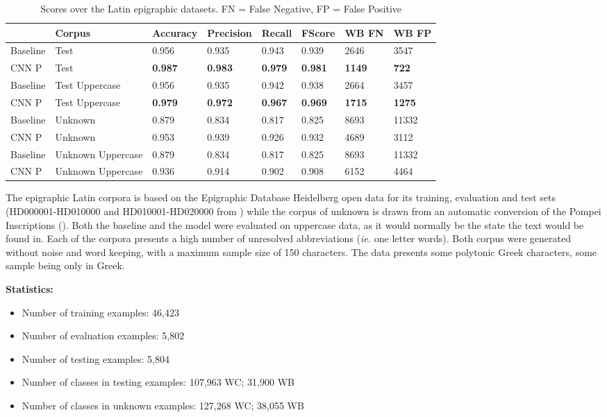 \documentclass{jdmdh}
\begin{document}
\begin{table}[H]
\centering
\begin{tabular}{llllllll}
\hline
 & Corpus & Accuracy & Precision & Recall & FScore & WB FN & WB FP \\ \hline
Baseline & Test & 0.956 & 0.935 & 0.943 & 0.939 & 2646 & 3547 \\
CNN P & Test & \textbf{0.987} & \textbf{0.983} & \textbf{0.979} & \textbf{0.981} & \textbf{1149} & \textbf{722} \\ \hline
Baseline & Test Uppercase & 0.956 & 0.935 & 0.942 & 0.938 & 2664 & 3457 \\
CNN P & Test Uppercase & \textbf{0.979} & \textbf{0.972} & \textbf{0.967} & \textbf{0.969} & \textbf{1715} & \textbf{1275} \\ \hline
Baseline & Unknown & 0.879 & 0.834 & 0.817 & 0.825 & 8693 & 11332 \\
CNN P & Unknown & 0.953 & 0.939 & 0.926 & 0.932 & 4689 & 3112 \\ \hline
Baseline & Unknown Uppercase & 0.879 & 0.834 & 0.817 & 0.825 & 8693 & 11332 \\
CNN P & Unknown Uppercase & 0.936 & 0.914 & 0.902 & 0.908 & 6152 & 4464 \\ \hline
\end{tabular}
\caption{Scores over the Latin epigraphic datasets. FN = False Negative, FP = False Positive}
\label{tab:epigraphyc_latin}
\end{table}


The epigraphic Latin corpora is based on the Epigraphic Database Heidelberg open data \citet{formulae} for its training, evaluation and test sets (HD000001-HD010000 and HD010001-HD020000 from \citet{edh}) while the corpus of unknown is drawn from an automatic conversion of the Pompei Inscriptions (\citet{pompei}). Both the baseline and the model were evaluated on uppercase data, as it would normally be the state the text would be found in. Each of the corpora presents a high number of unresolved abbreviations (\textit{ie.} one letter words). Both corpus were generated without noise and word keeping, with a maximum sample size of 150 characters. The data presents some polytonic Greek characters, some sample being only in Greek.

\textbf{Statistics:}

\begin{itemize}
\item Number of training examples: 46,423
\item Number of evaluation examples: 5,802
\item Number of testing examples: 5,804
\item Number of classes in testing examples: 107,963 WC; 31,900 WB
\item Number of classes in unknown examples: 127,268 WC; 38,055 WB
\end{itemize}
\end{document}
